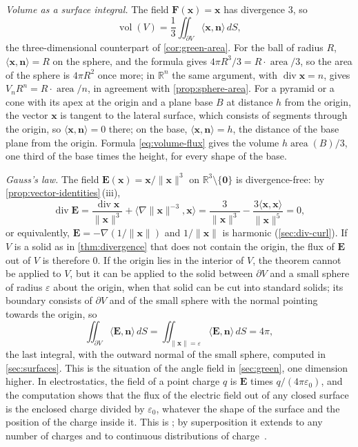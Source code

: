 \emph{Volume as a surface integral.} The field $\mathbf F(\mathbf x)=\mathbf x$ has divergence $3$, so
\begin{equation}
\operatorname{vol}(V)=\frac13\iint_{\partial V}\langle\mathbf x,\mathbf n\rangle\,dS ,
\label{eq:volume-flux}
\end{equation}
the three-dimensional counterpart of \cref{cor:green-area}. For the ball of radius $R$, $\langle\mathbf x,\mathbf n\rangle=R$ on the sphere, and the formula gives $4\pi R^3/3=R\cdot\operatorname{area}/3$, so the area of the sphere is $4\pi R^2$ once more; in $\mathbb R^n$ the same argument, with $\operatorname{div}\mathbf x=n$, gives $V_nR^n=R\cdot\operatorname{area}/n$, in agreement with \cref{prop:sphere-area}. For a pyramid or a cone with its apex at the origin and a plane base $B$ at distance $h$ from the origin, the vector $\mathbf x$ is tangent to the lateral surface, which consists of segments through the origin, so $\langle\mathbf x,\mathbf n\rangle=0$ there; on the base, $\langle\mathbf x,\mathbf n\rangle=h$, the distance of the base plane from the origin. Formula \eqref{eq:volume-flux} gives the volume $h\operatorname{area}(B)/3$, one third of the base times the height, for every shape of the base.

\emph{Gauss's law.} The field $\mathbf E(\mathbf x)=\mathbf x/\|\mathbf x\|^3$ on $\mathbb R^3\setminus\{\mathbf0\}$ is divergence-free: by \cref{prop:vector-identities}\,(iii),
\[
\operatorname{div}\mathbf E=\frac{\operatorname{div}\mathbf x}{\|\mathbf x\|^3}+\bigl\langle\nabla\|\mathbf x\|^{-3},\mathbf x\bigr\rangle=\frac3{\|\mathbf x\|^3}-\frac{3\langle\mathbf x,\mathbf x\rangle}{\|\mathbf x\|^5}=0 ,
\]
or equivalently, $\mathbf E=-\nabla(1/\|\mathbf x\|)$ and $1/\|\mathbf x\|$ is harmonic (\cref{sec:div-curl}). If $V$ is a solid as in \cref{thm:divergence} that does not contain the origin, the flux of $\mathbf E$ out of $V$ is therefore $0$. If the origin lies in the interior of $V$, the theorem cannot be applied to $V$, but it can be applied to the solid between $\partial V$ and a small sphere of radius $\varepsilon$ about the origin, when that solid can be cut into standard solids; its boundary consists of $\partial V$ and of the small sphere with the normal pointing towards the origin, so
\[
\iint_{\partial V}\langle\mathbf E,\mathbf n\rangle\,dS=\iint_{\|\mathbf x\|=\varepsilon}\langle\mathbf E,\mathbf n\rangle\,dS=4\pi ,
\]
the last integral, with the outward normal of the small sphere, computed in \cref{sec:surfaces}. This is the situation of the angle field in \cref{sec:green}, one dimension higher. In electrostatics, the field of a point charge $q$ is $\mathbf E$ times $q/(4\pi\varepsilon_0)$, and the computation shows that the flux of the electric field out of any closed surface is the enclosed charge divided by $\varepsilon_0$, whatever the shape of the surface and the position of the charge inside it. This is ; by superposition it extends to any number of charges and to continuous distributions of charge~\cite{marsden2012vector}.

